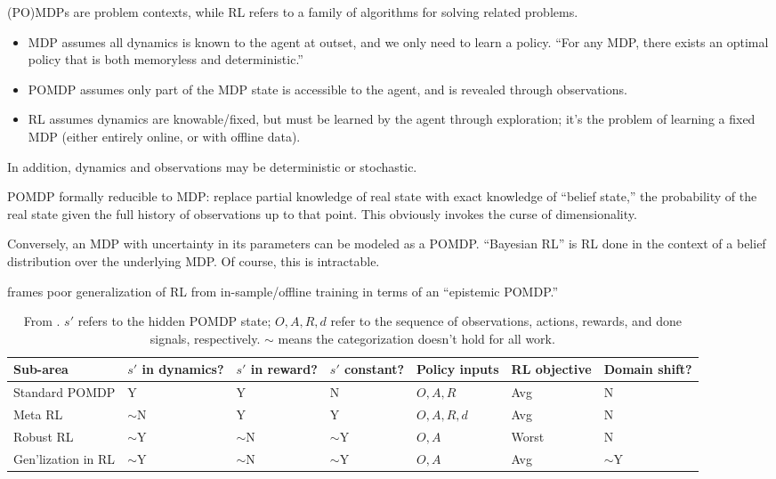 \documentclass[notitlepage,openany,11pt]{report}
\numberwithin{equation}{section}
\theoremstyle{plain}%
\begin{document}
(PO)MDPs are problem contexts, while RL refers to a family of algorithms for solving related problems.
\begin{itemize}
\item MDP assumes all dynamics is known to the agent at outset, and we only need to learn a policy. ``For any MDP, there exists an optimal policy that is both memoryless and deterministic.''  
\item POMDP assumes only part of the MDP state is accessible to the agent, and is revealed through observations.
\item RL assumes dynamics are knowable/fixed, but must be learned by the agent through exploration; it's the problem of learning a fixed MDP (either entirely online, or with offline data).
\end{itemize}
In addition, dynamics and observations may be deterministic or stochastic. 

POMDP formally reducible to MDP: replace partial knowledge of real state with exact knowledge of ``belief state,'' the probability of the real state given the full history of observations up to that point. This obviously invokes the curse of dimensionality.

Conversely, an MDP with uncertainty in its parameters can be modeled as a POMDP. ``Bayesian RL'' is RL done in the context of a belief distribution over the underlying MDP. Of course, this is intractable.

\cite{GhoshEtAl:21} frames poor generalization of RL from in-sample/offline training in terms of an ``epistemic POMDP.''


\begin{table}[h!]
\centering
\begin{tabularx}{0.95\textwidth} { 
>{\raggedright\arraybackslash}X >{\raggedright\arraybackslash}X >{\raggedright\arraybackslash}X >{\raggedright\arraybackslash}X >{\raggedright\arraybackslash}X >{\raggedright\arraybackslash}X >{\raggedright\arraybackslash}X
}
\hline\hline
Sub-area & $s'$ in dynamics? & $s'$ in reward? & $s'$ constant? & Policy inputs & RL objective & Domain shift? \\
\hline\hline
Standard POMDP & Y & Y & N & $O, A, R$ & Avg & N \\ 
\hline
Meta RL & $\sim$N & Y & Y & $O, A, R, d$ & Avg & N \\ 
\hline
Robust RL & $\sim$Y & $\sim$N & $\sim$Y & $O, A$ & Worst & N \\ 
\hline
Gen'lization in RL & $\sim$Y & $\sim$N & $\sim$Y & $O, A$ & Avg &  $\sim$Y \\ 
\hline\hline
\end{tabularx}
\caption{From \cite{NiEtAl:21}. $s'$ refers to the hidden POMDP state; $O, A, R, d$ refer to the sequence of observations, actions, rewards, and done signals, respectively. $\sim$ means the categorization doesn't hold for all work.
}
\end{table}
\end{document}
